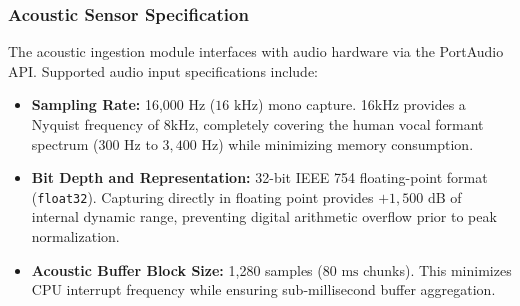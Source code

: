 \subsubsection{Acoustic Sensor Specification}
The acoustic ingestion module interfaces with audio hardware via the PortAudio API. Supported audio input specifications include:
\begin{itemize}
    \item \textbf{Sampling Rate:} 16,000 Hz ($16\text{ kHz}$) mono capture. 16kHz provides a Nyquist frequency of 8kHz, completely covering the human vocal formant spectrum ($300\text{ Hz}$ to $3,400\text{ Hz}$) while minimizing memory consumption.
    \item \textbf{Bit Depth and Representation:} 32-bit IEEE 754 floating-point format (\texttt{float32}). Capturing directly in floating point provides $+1,500\text{ dB}$ of internal dynamic range, preventing digital arithmetic overflow prior to peak normalization.
    \item \textbf{Acoustic Buffer Block Size:} 1,280 samples ($80\text{ ms}$ chunks). This minimizes CPU interrupt frequency while ensuring sub-millisecond buffer aggregation.
\end{itemize}

